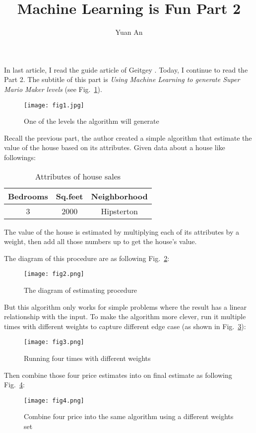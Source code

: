 \documentclass[a4paper,12pt,twocolumn]{article}
\title{Machine Learning is Fun Part 2}
\author{Yuan An}
\begin{document}
\maketitle

In last article, I read the guide article of Geitgey \cite{MLisFun}. Today, I continue to read the Part 2. The subtitle of this part is \emph{Using Machine Learning to generate Super Mario Maker levels} (see Fig.~\ref{fig1}). 
\begin{figure}[h]
	\centering
	\texttt{[image: fig1.jpg]}
	\caption{One of the levels the algorithm will generate}\label{fig1}
\end{figure}
\par
Recall the previous part, the author created a simple algorithm that estimate the value of the house based on its attributes. Given data about a house like followings:
\begin{table}[h]
	\centering
	\caption{Attributes of house sales}
	\begin{tabular}{ccc}
		\toprule
		Bedrooms & Sq.feet & Neighborhood\\
		\midrule
		3 & 2000 & Hipsterton \\
		\bottomrule
	\end{tabular}
\end{table}
\par
The value of the house is estimated by multiplying each of its attributes by a weight, then add all those numbers up to get the house's value.
\par
The diagram of this procedure are as following Fig.~\ref{fig2}:
\begin{figure}[h]
	\centering
	\texttt{[image: fig2.png]}
	\caption{The diagram of estimating procedure}\label{fig2}
\end{figure}
\par
But this algorithm only works for simple problems where the result has a linear relationship with the input. To make the algorithm more clever, run it multiple times with different weights to capture different edge case (as shown in Fig.~\ref{fig3}):
\begin{figure}[h]
	\centering
	\texttt{[image: fig3.png]}
	\caption{Running four times with different weights}\label{fig3}
\end{figure}
\par
Then combine those four price estimates into on final estimate as following Fig.~\ref{fig4}:
\begin{figure}[h]
	\centering
	\texttt{[image: fig4.png]}
	\caption{Combine four price into the same algorithm using a different weights set} 
	\label{fig4}
\end{figure}
\end{document}
